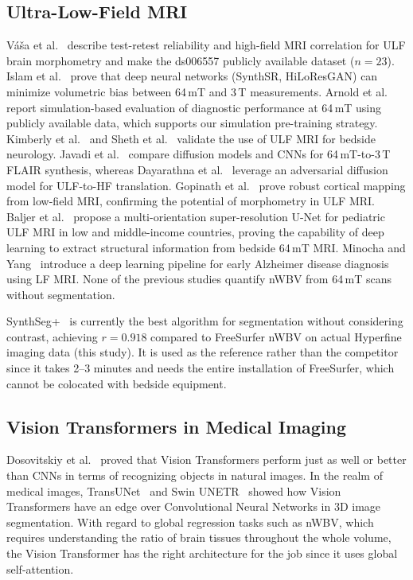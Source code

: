 \documentclass[12pt,a4paper]{article}
\begin{document}
\subsection{Ultra-Low-Field MRI}

V{\'a}{\v s}a et al.~\cite{vasa2025imaneur,vasa2025} describe test-retest
reliability and high-field MRI correlation for ULF brain morphometry and make
the ds006557 publicly available dataset ($n = 23$). Islam et
al.~\cite{islam2025aibrain} prove that deep neural networks (SynthSR,
HiLoResGAN) can minimize volumetric bias between 64\,mT and 3\,T
measurements. Arnold et al.~\cite{arnold2022simulated} report
simulation-based evaluation of diagnostic performance at 64\,mT using
publicly available data, which supports our simulation pre-training strategy.
Kimberly et al.~\cite{kimberly2023bedside} and Sheth et
al.~\cite{sheth2021assessmentultralow} validate the use of ULF MRI for
bedside neurology. Javadi et al.~\cite{javadi2025diffusion} compare diffusion
models and CNNs for 64\,mT-to-3\,T FLAIR synthesis, whereas Dayarathna et
al.~\cite{dayarathna2024adversarial} leverage an adversarial diffusion model
for ULF-to-HF translation. Gopinath et al.~\cite{gopinath2025cortical} prove
robust cortical mapping from low-field MRI, confirming the potential of
morphometry in ULF MRI. Baljer et al.~\cite{baljer2024paediatric} propose a
multi-orientation super-resolution U-Net for pediatric ULF MRI in low and
middle-income countries, proving the capability of deep learning to extract
structural information from bedside 64\,mT MRI. Minocha and
Yang~\cite{minocha2024lfmri} introduce a deep learning pipeline for early
Alzheimer disease diagnosis using LF MRI. None of the previous studies
quantify nWBV from 64\,mT scans without segmentation.

SynthSeg+~\cite{billot2023synthseg} is currently the best algorithm for
segmentation without considering contrast, achieving $r = 0.918$
compared to FreeSurfer nWBV on actual Hyperfine imaging data (this study). It
is used as the reference rather than the competitor since it takes 2--3
minutes and needs the entire installation of FreeSurfer, which cannot be
colocated with bedside equipment.

\subsection{Vision Transformers in Medical Imaging}

Dosovitskiy et al.~\cite{dosovitskiy2020image} proved that Vision Transformers
perform just as well or better than CNNs in terms of recognizing objects in
natural images. In the realm of medical images,
TransUNet~\cite{chen2021transunet} and Swin
UNETR~\cite{hatamizadeh2021swin} showed how Vision Transformers have an edge
over Convolutional Neural Networks in 3D image segmentation. With regard to
global regression tasks such as nWBV, which requires understanding the ratio
of brain tissues throughout the whole volume, the Vision Transformer has the
right architecture for the job since it uses global self-attention.
\end{document}
